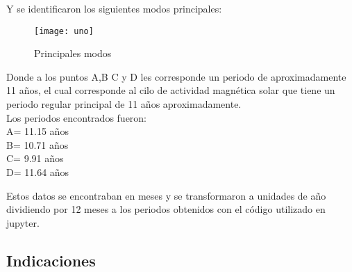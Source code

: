 \documentclass[12pt]{article}
\begin{document}
\newpage 
Y se identificaron los siguientes modos principales:

\begin{figure}[ht]
\texttt{[image: uno]}
\caption{Principales modos}
\centering
\end{figure}

Donde a los puntos A,B C y D les corresponde un periodo de aproximadamente 11 años, el cual corresponde al cilo de actividad magnética solar que tiene un periodo regular principal de 11 años aproximadamente.\\
Los periodos encontrados fueron:\\

A= 11.15 años\\
B= 10.71 años \\
C= 9.91 años \\
D= 11.64 años

Estos datos se encontraban en meses y se transformaron a unidades de año dividiendo por 12 meses a los periodos obtenidos con el código utilizado en jupyter.\\

\newpage 

\subsection*{Indicaciones}
\end{document}
